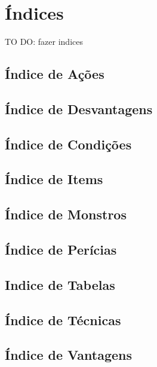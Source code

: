 \chapter{Índices}
TO DO: fazer indices
\section{Índice de Ações}
\section{Índice de Desvantagens}
\section{Índice de Condições}
\section{Índice de Items}
\section{Índice de Monstros}
\section{Índice de Perícias}
\section{Indice de Tabelas}
\listoftables
\section{Índice de Técnicas}
\section{Índice de Vantagens}
%
%
%
%
